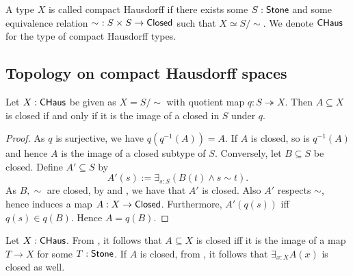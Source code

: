 
\begin{definition}
  A type $X$ is called compact Hausdorff if there exists some $S:\mathsf{Stone}$ and some 
  equivalence relation $\sim\ : S\times S \to \mathsf{Closed}$ such that $X \simeq S/\sim$. 
  We denote $\mathsf{CHaus}$ for the type of compact Hausdorff types. 
\end{definition} 

\subsection{Topology on compact Hausdorff spaces}

\begin{lemma}\label{CompactHausdorffClosed}
  Let $X:\mathsf{CHaus}$ be given as $X=S/\sim$ with quotient map $q:S\twoheadrightarrow X$.
  Then $A\subseteq X$ is closed if and only if it is the image of a closed in $S$ under $q$. 
\end{lemma}
\begin{proof}
  As $q$ is surjective, we have $q(q^{-1}(A)) = A$.
  If $A$ is closed, so is $q^{-1}(A)$ and 
  hence $A$ is the image of a closed subtype of $S$. 
  Conversely, let $B\subseteq S$ be closed. 
  Define $A'\subseteq S$ by 
  $$A'(s) := \exists_{s:S} (B(t) \wedge s \sim t).$$
  As $B, \sim$ are closed, by  and , 
  we have that $A'$  is closed. 
  Also $A'$ respects $\sim$, hence induces a map $A: X\to \mathsf{Closed}$.
  Furthermore, $A'(q(s))$ iff $q(s)\in q(B)$. 
  Hence $A=q(B)$. 
\end{proof}
\begin{remark}\label{InhabitedClosedSubSpaceClosedCHaus}
  Let $X:\mathsf{CHaus}$.
  From , it follows that $A\subseteq X$ is closed iff it is the image of a map 
  $T\to X$ for some $T:\mathsf{Stone}$. 
  If $A$ is closed, from , it follows that $\exists_{x:X} A(x)$ is closed as well. 
\end{remark}
